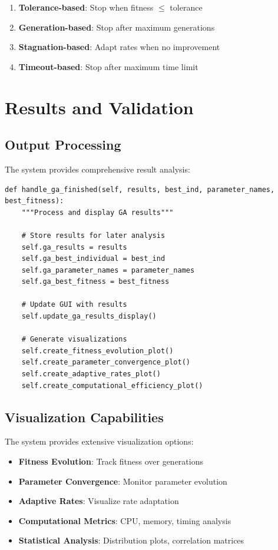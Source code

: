 \documentclass[12pt,a4paper]{article}
\begin{document}
\begin{enumerate}
    \item \textbf{Tolerance-based}: Stop when fitness $\leq$ tolerance
    \item \textbf{Generation-based}: Stop after maximum generations
    \item \textbf{Stagnation-based}: Adapt rates when no improvement
    \item \textbf{Timeout-based}: Stop after maximum time limit
\end{enumerate}

\section{Results and Validation}

\subsection{Output Processing}
The system provides comprehensive result analysis:

\begin{lstlisting}[caption=Result Processing]
def handle_ga_finished(self, results, best_ind, parameter_names, best_fitness):
    """Process and display GA results"""
    
    # Store results for later analysis
    self.ga_results = results
    self.ga_best_individual = best_ind
    self.ga_parameter_names = parameter_names
    self.ga_best_fitness = best_fitness
    
    # Update GUI with results
    self.update_ga_results_display()
    
    # Generate visualizations
    self.create_fitness_evolution_plot()
    self.create_parameter_convergence_plot()
    self.create_adaptive_rates_plot()
    self.create_computational_efficiency_plot()
\end{lstlisting}

\subsection{Visualization Capabilities}
The system provides extensive visualization options:

\begin{itemize}
    \item \textbf{Fitness Evolution}: Track fitness over generations
    \item \textbf{Parameter Convergence}: Monitor parameter evolution
    \item \textbf{Adaptive Rates}: Visualize rate adaptation
    \item \textbf{Computational Metrics}: CPU, memory, timing analysis
    \item \textbf{Statistical Analysis}: Distribution plots, correlation matrices
\end{itemize}
\end{document}
